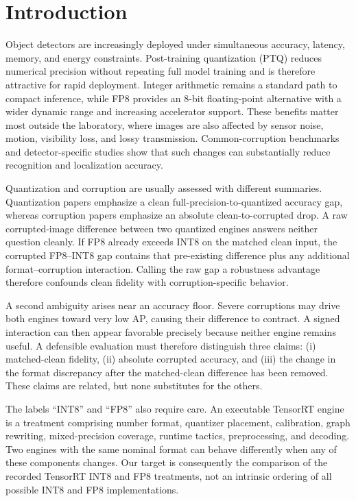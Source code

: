\section{Introduction}
\label{sec:introduction}

Object detectors are increasingly deployed under simultaneous accuracy,
latency, memory, and energy constraints. Post-training quantization (PTQ)
reduces numerical precision without repeating full model training and is
therefore attractive for rapid deployment\citep{jacob2018integer,banner2019post}.
Integer arithmetic remains a standard path to compact inference, while FP8
provides an 8-bit floating-point alternative with a wider dynamic range and
increasing accelerator support\citep{micikevicius2022fp8,shen2024fp8}. These
benefits matter most outside the laboratory, where images are also affected by
sensor noise, motion, visibility loss, and lossy transmission. Common-corruption
benchmarks and detector-specific studies show that such changes can substantially
reduce recognition and localization accuracy\citep{hendrycks2019corruptions,
michaelis2019detectorrobustness,liu2024realworldcorruptions}.

Quantization and corruption are usually assessed with different summaries.
Quantization papers emphasize a clean full-precision-to-quantized accuracy gap,
whereas corruption papers emphasize an absolute clean-to-corrupted drop. A raw
corrupted-image difference between two quantized engines answers neither
question cleanly. If FP8 already exceeds INT8 on the matched clean input, the
corrupted FP8--INT8 gap contains that pre-existing difference plus any additional
format--corruption interaction. Calling the raw gap a robustness advantage
therefore confounds clean fidelity with corruption-specific behavior.

A second ambiguity arises near an accuracy floor. Severe corruptions may drive
both engines toward very low AP, causing their difference to contract. A signed
interaction can then appear favorable precisely because neither engine remains
useful. A defensible evaluation must therefore distinguish three claims:
(i) matched-clean fidelity, (ii) absolute corrupted accuracy, and (iii) the
change in the format discrepancy after the matched-clean difference has been
removed. These claims are related, but none substitutes for the others.

The labels ``INT8'' and ``FP8'' also require care. An executable TensorRT engine
is a treatment comprising number format, quantizer placement, calibration,
graph rewriting, mixed-precision coverage, runtime tactics, preprocessing, and
decoding. Two engines with the same nominal format can behave differently when
any of these components changes. Our target is consequently the comparison of
the recorded TensorRT INT8 and FP8 treatments, not an intrinsic ordering of all
possible INT8 and FP8 implementations.

